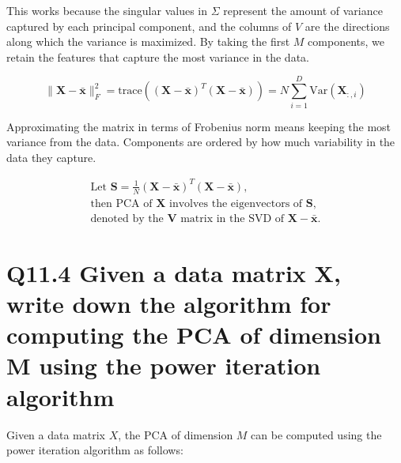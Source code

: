 \documentclass[11pt]{article}
\begin{document}
This works because the singular values in \( \Sigma \) represent the amount of variance captured by each principal component, and the columns of \( V \) are the directions along which the variance is maximized. By taking the first \( M \) components, we retain the features that capture the most variance in the data.

\[
\| \mathbf{X} - \bar{\mathbf{x}} \|_F^2 = \text{trace} \left( (\mathbf{X} - \bar{\mathbf{x}})^T (\mathbf{X} - \bar{\mathbf{x}}) \right) = N \sum_{i=1}^{D} \text{Var}(\mathbf{X}_{:,i})
\]

Approximating the matrix in terms of Frobenius norm means keeping the most variance from the data. Components are ordered by how much variability in the data they capture.

\[
\begin{gathered}
\text{Let } \mathbf{S} = \frac{1}{N} (\mathbf{X} - \bar{\mathbf{x}})^T (\mathbf{X} - \bar{\mathbf{x}}), \\
\text{then PCA of } \mathbf{X} \text{ involves the eigenvectors of } \mathbf{S}, \\
\text{denoted by the } \mathbf{V} \text{ matrix in the SVD of } \mathbf{X} - \bar{\mathbf{x}}.
\end{gathered}
\]

\section{Q11.4 Given a data matrix X, write down the algorithm for computing the PCA of dimension M using the power iteration algorithm}

Given a data matrix \( X \), the PCA of dimension \( M \) can be computed using the power iteration algorithm as follows:
\end{document}
